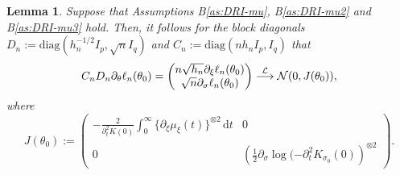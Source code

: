 \documentclass[a4paper,10pt,twoside]{article}
\newtheorem{lem}{Lemma}[section]
\numberwithin{equation}{section}
\def\l{\left}
\def\r{\right}
\def\s{\sigma}
\def\p{\partial}
\def\toD{\stackrel{{\cal L}}{\longrightarrow}}
\def\df{\mathrm{d}}
\begin{document}
\begin{lem}\label{lem:score-vector}
Suppose that Assumptions B\ref{as:DRI-mu}, B\ref{as:DRI-mu2} and B\ref{as:DRI-mu3} hold. 
Then, it follows for the block diagonals $D_n := \mathrm{diag}\l( h_n^{-1/2} I_p,  \sqrt{n}I_q\r)$  and $C_n := \mathrm{diag}\l( nh_n I_p, I_q\r)$ that 
\[
C_nD_n \partial_\theta \ell_n(\theta_0)
=
\begin{pmatrix}
n\sqrt{h_n}\partial_\xi \ell_n(\theta_0) \\
\sqrt{n} \partial_\sigma \ell_n(\theta_0)
\end{pmatrix}
\toD \mathcal{N}(0, J(\theta_0)),
\]
where  
\[
J(\theta_0) := 
\begin{pmatrix}
 -\frac{2}{\partial_t^2 K(0)}\int_0^\infty \{\p_\xi \mu_{\xi}(t)\}^{\otimes 2}\, \df t &0 \\
0 & \l( \frac{1}{2} \p_\s \log (-\partial_t^2 K_{\sigma_0}(0) \r)^{\otimes 2} 
\end{pmatrix}. 
\]
\end{lem}
\end{document}
